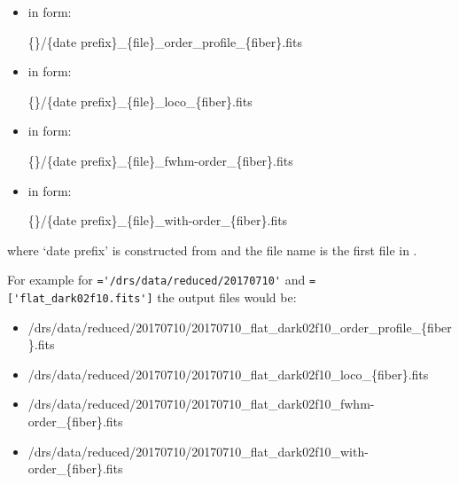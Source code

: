 \begin{itemize}
\item {} in form:
\begin{tcustomdir}
\{\reduceddir\}/\{date prefix\}\_\{file\}\_order\_profile\_\{fiber\}.fits
\end{tcustomdir}

\item {} in form:
\begin{tcustomdir}
\{\reduceddir\}/\{date prefix\}\_\{file\}\_loco\_\{fiber\}.fits
\end{tcustomdir}

\item {} in form:
\begin{tcustomdir}
\{\reduceddir\}/\{date prefix\}\_\{file\}\_fwhm-order\_\{fiber\}.fits
\end{tcustomdir}

\item {} in form:
\begin{tcustomdir}
\{\reduceddir\}/\{date prefix\}\_\{file\}\_with-order\_\{fiber\}.fits
\end{tcustomdir}

\end{itemize}

\noindent where `date prefix' is constructed from \argnightname and the file name is the first file in \argfilenames. \\

\clearpage
\newpage

\noindent For example for \reduceddir\lstinline[style=pythoninline]|='/drs/data/reduced/20170710'| and \argfilenames\lstinline[style=pythoninline]|=['flat_dark02f10.fits']| the output files would be:
\begin{tcustomdir}
\begin{itemize}
\item /drs/data/reduced/20170710/20170710\_flat\_dark02f10\_order\_profile\_\{fiber\}.fits
\item /drs/data/reduced/20170710/20170710\_flat\_dark02f10\_loco\_\{fiber\}.fits
\item /drs/data/reduced/20170710/20170710\_flat\_dark02f10\_fwhm-order\_\{fiber\}.fits
\item /drs/data/reduced/20170710/20170710\_flat\_dark02f10\_with-order\_\{fiber\}.fits
\end{itemize}
\end{tcustomdir}

